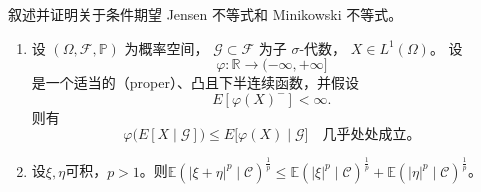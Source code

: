 \documentclass{ctexart}
\begin{document}
\begin{problem}\label{pro:7}
  叙述并证明关于条件期望 Jensen 不等式和 Minikowski 不等式。
  \begin{enumerate}
    \item 设 $(\Omega,\mathcal F,\mathbb P)$ 为概率空间，
      $\mathcal G\subset\mathcal F$ 为子 $\sigma$-代数，
      $X\in L^{1}(\Omega)$。
      设
      \[
        \varphi:\mathbb R\to(-\infty,+\infty]
      \]
      是一个适当的（proper）、凸且下半连续函数，并假设
      \[
        E[\varphi(X)^-]<\infty .
      \]
      则有
      \[
        \varphi\bigl(E[X\mid\mathcal G]\bigr)
        \le
        E\bigl[\varphi(X)\mid\mathcal G\bigr]
        \quad \text{几乎处处成立。}
      \]
    \item 设\(\xi,\eta \)可积，\(p>1 \)。则\(\mathbb{E}(|\xi + \eta|^p \mid \mathcal{C})^{\frac{1}{p}} \leq \mathbb{E}(|\xi|^p \mid \mathcal{C})^{\frac{1}{p}} + \mathbb{E}(|\eta|^p \mid \mathcal{C})^{\frac{1}{p}}\)。
  \end{enumerate}
\end{problem}
\end{document}
